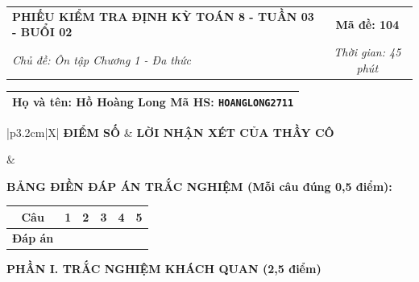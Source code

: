 \documentclass[12pt,a4paper]{article}
\begin{document}
\newpage


\noindent
\begin{tabularx}{\linewidth}{|X|c|}
\hline
\textbf{PHIẾU KIỂM TRA ĐỊNH KỲ TOÁN 8 - TUẦN 03 - BUỔI 02} & \textbf{Mã đề: 104} \\
\textit{Chủ đề: Ôn tập Chương 1 - Đa thức} & \textit{Thời gian: 45 phút} \\
\hline
\end{tabularx}

\vspace{1mm}

\noindent
\begin{tabularx}{\linewidth}{|X|}
\hline
\rule[-2mm]{0pt}{7.5mm}\textbf{Họ và tên:} \textbf{\large Hồ Hoàng Long} \hfill \textbf{Mã HS:} \texttt{HOANGLONG2711} \quad \\
\hline
\end{tabularx}

\vspace{1mm}

\noindent
\begin{tabularx}{\linewidth}{|p{3.2cm}|X|}
\hline
\centering\textbf{ĐIỂM SỐ} & \centering\textbf{LỜI NHẬN XÉT CỦA THẦY CÔ} \tabularnewline
\hline
\rule{0pt}{1.3cm} & \tabularnewline
\hline
\end{tabularx}

\vspace{1.2mm}

\noindent\textbf{BẢNG ĐIỀN ĐÁP ÁN TRẮC NGHIỆM (Mỗi câu đúng 0,5 điểm):}
\vspace{0.8mm}

\noindent
\renewcommand{\arraystretch}{1.35}
\begin{tabularx}{\linewidth}{|c|*{5}{>{\centering\arraybackslash}X|}}
\hline
\textbf{Câu} & \textbf{1} & \textbf{2} & \textbf{3} & \textbf{4} & \textbf{5} \\
\hline
\textbf{Đáp án} & & & & & \\
\hline
\end{tabularx}
\renewcommand{\arraystretch}{1.0}

\vspace{1.5mm}

\noindent\textbf{\large PHẦN I. TRẮC NGHIỆM KHÁCH QUAN (2,5 điểm)}
\vspace{1mm}
\end{document}
